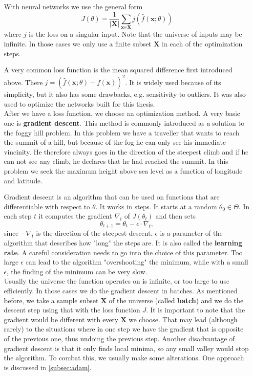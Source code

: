 With neural networks we use the general form $$J(\theta) = \frac{1}{|\textbf{X}|} \sum_{\textbf{x}\in \textbf{X}}j(\widehat{f}(\textbf{x};\theta))$$ where $j$ is the loss on a singular input. Note that the universe of inputs may be infinite. In those cases we only use a finite subset $\textbf{X}$ in each of the optimization steps. 

A very common loss function is the mean squared difference first introduced above. There $j=(\widehat{f}(\textbf{x};\theta)-f(\textbf{x}))^2$. It is widely used because of its simplicity, but it also has some drawbacks, e.g. sensitivity to outliers. It was also used to optimize the networks built for this thesis.\\

After we have a loss function, we choose an optimization method. A very basic one is \textbf{gradient descent}. This method is commonly introduced as a solution to the foggy hill problem. In this problem we have a traveller that wants to reach the summit of a hill, but because of the fog he can only see his immediate vincinity. He therefore always goes in the direction of the steepest climb and if he can not see any climb, he declares that he had reached the summit. In this problem we seek the maximum height above sea level as a function of longitude and latitude.

Gradient descent is an algorithm that can be used on functions that are differentiable with respect to $\theta$. It works in steps. It starts at a random $\theta_0 \in \Theta$. In each step $t$ it computes the gradient $\nabla_t$ of $J(\theta_t)$ and then sets $$\theta_{t+1}=\theta_t-\epsilon\cdot\nabla_t,$$ since $-\nabla_t$ is the direction of the steepest descent. $\epsilon$ is a parameter of the algorithm that describes how "long" the steps are. It is also called the \textbf{learning rate}. A careful consideration needs to go into the choice of this parameter. Too large $\epsilon$ can lead to the algorithm "overshooting" the minimum, while with a small $\epsilon$, the finding of the minimum can be very slow.\\

Usually the universe the function operates on is infinite, or too large to use efficiently. In those cases we do the gradient descent in batches. As mentioned before, we take a sample subset $\textbf{X}$ of the universe (called \textbf{batch}) and we do the descent step using that with the loss function $J$. It is important to note that the gradient would be different with every $\textbf{X}$ we choose. That may lead (although rarely) to the situations where in one step we have the gradient that is opposite of the previous one, thus undoing the previous step. Another disadvantage of gradient descent is that it only finds local minima, so any small valley would stop the algorithm. To combat this, we usually make some alterations. One approach is discussed in \autoref{subsec:adam}.

